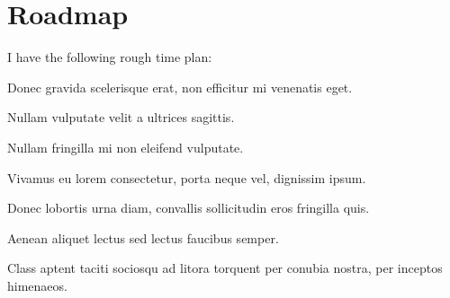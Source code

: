 
\section*{Roadmap}
I have the following rough time plan:
\begin{description}[leftmargin=\parindent,labelindent=\parindent]
  \setlength\itemsep{0em}
    \item[\displaydate{dateOne}:] Donec gravida scelerisque erat, non efficitur mi venenatis eget.
    \item[\displaydate{dateTwo}:] Nullam vulputate velit a ultrices sagittis.
    \item[\displaydate{dateThree}:] Nullam fringilla mi non eleifend vulputate.
    \item[\displaydate{dateFour}:] Vivamus eu lorem consectetur, porta neque vel, dignissim ipsum.
    \item[\displaydate{dateFive}:] Donec lobortis urna diam, convallis sollicitudin eros fringilla quis.
    \item[\displaydate{dateSix}:] Aenean aliquet lectus sed lectus faucibus semper.
    \item[\displaydate{dateSeven}:] Class aptent taciti sociosqu ad litora torquent per conubia nostra, per inceptos himenaeos.

\end{description}